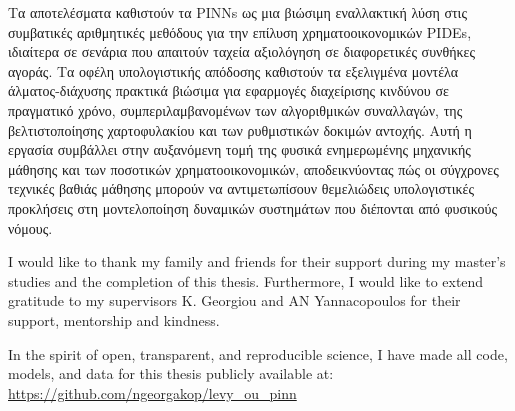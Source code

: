 \begin{greekabstract}
    Τα αποτελέσματα καθιστούν τα PINNs ως μια βιώσιμη εναλλακτική λύση στις συμβατικές αριθμητικές μεθόδους για την επίλυση χρηματοοικονομικών PIDEs, ιδιαίτερα σε σενάρια που απαιτούν ταχεία αξιολόγηση σε διαφορετικές συνθήκες αγοράς. Τα οφέλη υπολογιστικής απόδοσης καθιστούν τα εξελιγμένα μοντέλα άλματος-διάχυσης πρακτικά βιώσιμα για εφαρμογές διαχείρισης κινδύνου σε πραγματικό χρόνο, συμπεριλαμβανομένων των αλγοριθμικών συναλλαγών, της βελτιστοποίησης χαρτοφυλακίου και των ρυθμιστικών δοκιμών αντοχής. Αυτή η εργασία συμβάλλει στην αυξανόμενη τομή της φυσικά ενημερωμένης μηχανικής μάθησης και των ποσοτικών χρηματοοικονομικών, αποδεικνύοντας πώς οι σύγχρονες τεχνικές βαθιάς μάθησης μπορούν να αντιμετωπίσουν θεμελιώδεις υπολογιστικές προκλήσεις στη μοντελοποίηση δυναμικών συστημάτων που διέπονται από φυσικούς νόμους.
{}

\end{greekabstract}


\begin{acknowledgements}
    I would like to thank my family and friends for their support during my master's studies and the completion of this thesis. Furthermore, I would like to extend gratitude to my supervisors K. Georgiou and AN Yannacopoulos for their support, mentorship and kindness.
    
    \vspace{1cm}
    
    In the spirit of open, transparent, and reproducible science, I have made all code, models, and data for this thesis publicly available at: \url{https://github.com/ngeorgakop/levy_ou_pinn}
\end{acknowledgements}



\tableofcontents

\listoffigures

\listoftables



